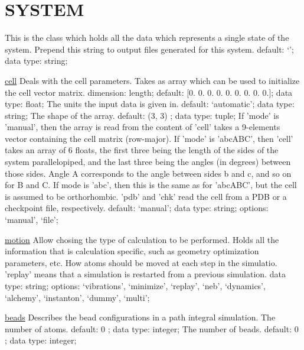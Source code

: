 \section{SYSTEM}
\label{SYSTEM}
\begin{ipifield}{}%
{This is the class which holds all the data which represents a single state of the system.}%
{}%
{%
{Prepend this string to output files generated for this system. }%
{default: `'; data type: string; }%
}
\begin{ipifield}{\hyperref[CELL]{cell}}%
{Deals with the cell parameters. Takes as array which can be used to initialize the cell vector matrix.}%
{dimension: length; default: 
      [0. 0. 0. 0. 0. 0. 0. 0. 0.]; data type: float; }%
{%
{The units the input data is given in.}%
{default: `automatic'; data type: string; }%
%
{The shape of the array.}%
{default:  (3, 3) ; data type: tuple; }%
%
{If 'mode' is 'manual', then the array is read from the content of 'cell' takes a 9-elements vector containing the cell matrix (row-major). If 'mode' is 'abcABC', then 'cell' takes an array of 6 floats, the first three being the length of the sides of the system parallelopiped, and the last three being the angles (in degrees) between those sides. Angle A corresponds to the angle between sides b and c, and so on for B and C. If mode is 'abc', then this is the same as for 'abcABC', but the cell is assumed to be orthorhombic. 'pdb' and 'chk' read the cell from a PDB or a checkpoint file, respectively.}%
{default: `manual'; data type: string; options: `manual', `file'; }%
}
\end{ipifield}
\begin{ipifield}{\hyperref[MOTION]{motion}}%
{Allow chosing the type of calculation to be performed. Holds all the information that is calculation specific, such as geometry optimization parameters, etc.}%
{}%
{%
{How atoms should be moved at each step in the simulatio. 'replay' means that a simulation is restarted from a previous simulation.}%
{data type: string; options: `vibrations', `minimize', `replay', `neb', `dynamics', `alchemy', `instanton', `dummy', `multi'; }%
}
\end{ipifield}
\begin{ipifield}{\hyperref[BEADS]{beads}}%
{Describes the bead configurations in a path integral simulation.}%
{}%
{%
{The number of atoms.}%
{default:  0 ; data type: integer; }%
%
{The number of beads.}%
{default:  0 ; data type: integer; }%
}
\end{ipifield}

\end{ipifield}
